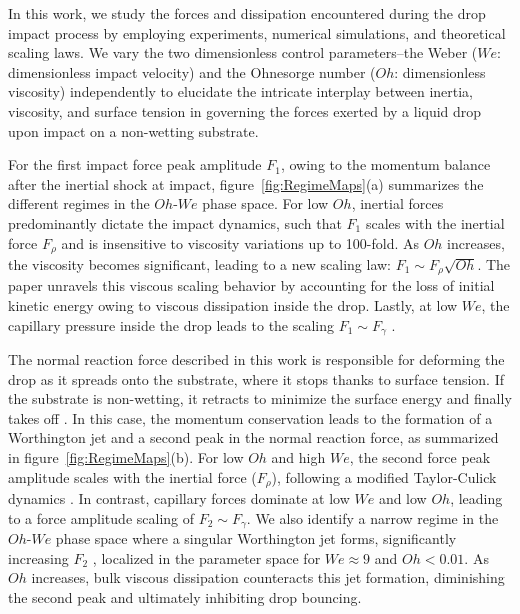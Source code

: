 \documentclass{jfm}
\begin{document}
In this work, we study the forces and dissipation encountered during the drop impact process by employing experiments, numerical simulations, and theoretical scaling laws. We vary the two dimensionless control parameters--the Weber ($We$: dimensionless impact velocity) and the Ohnesorge number ($Oh$: dimensionless viscosity) independently to elucidate the intricate interplay between inertia, viscosity, and surface tension in governing the forces exerted by a liquid drop upon impact on a non-wetting substrate.

For the first impact force peak amplitude $F_1$, owing to the momentum balance after the inertial shock at impact, figure~\ref{fig:RegimeMaps}(a) summarizes the different regimes in the $Oh$-$We$ phase space. For low $Oh$, inertial forces predominantly dictate the impact dynamics, such that $F_1$ scales with the inertial force $F_\rho$ \citep{Philippi2016, Gordillo2018, Mitchell2019, cheng2021drop, zhang2022impact} and is insensitive to viscosity variations up to 100-fold. As $Oh$ increases, the viscosity becomes significant, leading to a new scaling law: $F_1 \sim F_\rho\sqrt{Oh}$. The paper unravels this viscous scaling behavior by accounting for the loss of initial kinetic energy owing to viscous dissipation inside the drop. Lastly, at low $We$, the capillary pressure inside the drop leads to the scaling $F_1 \sim F_\gamma$ \citep{molavcek2012quasi, chevy2012liquid}. 

The normal reaction force described in this work is responsible for deforming the drop as it spreads onto the substrate, where it stops thanks to surface tension. If the substrate is non-wetting, it retracts to minimize the surface energy and finally takes off \citep{Richard2000}. In this case, the momentum conservation leads to the formation of a Worthington jet and a second peak in the normal reaction force, as summarized in figure~\ref{fig:RegimeMaps}(b). For low $Oh$ and high $We$, the second force peak amplitude scales with the inertial force ($F_\rho$), following a modified Taylor-Culick dynamics \citep{Eggers2010}. In contrast, capillary forces dominate at low $We$ and low $Oh$, leading to a force amplitude scaling of $F_2 \sim F_\gamma$. We also identify a narrow regime in the $Oh$-$We$ phase space where a singular Worthington jet forms, significantly increasing $F_2$ \citep{Bartolo2006Singular, zhang2022impact}, localized in the parameter space for $We \approx 9$ and $Oh < 0.01$. As $Oh$ increases, bulk viscous dissipation counteracts this jet formation, diminishing the second peak and ultimately inhibiting drop bouncing. 
\end{document}
